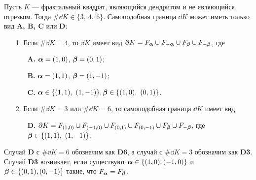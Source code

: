 \begin{theorem}\label{ssboundary}
% 
Пусть $K$ --- фрактальный квадрат, являющийся дендритом и не являющийся отрезком.
Тогда $\#\dd K\in\{3,\ 4,\ 6\}$.
Самоподобная граница $\dd K$ может иметь только вид {\bf A, B, C} или {\bf D}:
\begin{itemize}
\item[1.] Если $\#\dd K=4$, то $\dd K$ имеет вид $\partial K=F_{\bm{\alpha}}\cup F_{-{\bm{\alpha}}}\cup F_{\bm{\beta}}\cup F_{-{\bm{\beta}}}$, где
	\begin{itemize}
	\item[{\bf A.}] ${\bm{\alpha}}=(1,0)$, $ {\bm{\beta}}=(0,1)$;
	\item[{\bf B.}] ${\bm{\alpha}}=(1,1)$, $ {\bm{\beta}}=(1,-1)$;
	\item[{\bf C.}] $\bma\in\{(1,1),\ (1,-1)\},\bmb\in\{(1,0),\ (0,1)\}$.
	\end{itemize}
\item[2.] Если $\#\dd K=3$ или $\#\dd K=6$, то самоподобная граница $\dd K$ имеет вид
\begin{itemize}
	\item[{\bf D.}] $\partial K=F_{(1,0)}\cup F_{(-1,0)}\cup F_{(0,1)}\cup F_{(0,-1)}\cup F_{\bm{\beta}}\cup F_{-{\bm{\beta}}}$, где ${\bm{\beta}}\in\{(1,1),\ (1,-1)\}$.
	\end{itemize}
\end{itemize}
\end{theorem}

\begin{remark}
Случай {\bf D} с $\#\dd K=6$ обозначим как {\bf D6}, а случай с $\#\dd K=3$ обозначим как {\bf D3}.
Случай {\bf D3} возникает, если существуют ${\bm{\alpha}}\in\{(1,0),(-1,0)\}$ и ${\bm{\beta}}\in\{(0,1),(0,-1)\}$ такие, что $F_{\bm{\alpha}}=F_{\bm{\beta}}$.
\end{remark}

